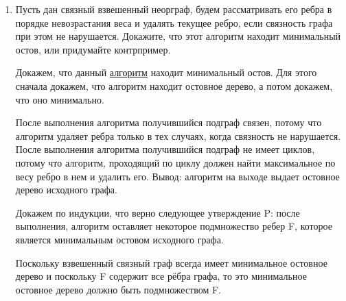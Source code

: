 \begin{enumerate}
  \item
    Пусть дан связный взвешенный неорграф, будем рассматривать его ребра в порядке невозрастания веса и
    удалять текущее ребро, если связность графа при этом не нарушается. Докажите, что этот алгоритм
    находит минимальный остов, или придумайте контрпример.

    \begin{solution}
      Докажем, что данный \href{https://ru.wikipedia.org/wiki/%D0%90%D0%BB%D0%B3%D0%BE%D1%80%D0%B8%D1%82%D0%BC_%D0%BE%D0%B1%D1%80%D0%B0%D1%82%D0%BD%D0%BE%D0%B3%D0%BE_%D1%83%D0%B4%D0%B0%D0%BB%D0%B5%D0%BD%D0%B8%D1%8F}{алгоритм} находит минимальный остов. Для этого сначала докажем, что алгоритм находит остовное дерево, а потом докажем, что оно минимально.

      После выполнения алгоритма получившийся подграф связен, потому что алгоритм удаляет ребра только в тех случаях, когда связность не нарушается. После выполнения алгоритма получившийся подграф не имеет циклов, потому что алгоритм, проходящий по циклу должен найти максимальное по весу ребро в нем и удалить его. Вывод: алгоритм на выходе выдает остовное дерево исходного графа.

      Докажем по индукции, что верно следующее утверждение P: после выполнения, алгоритм оставляет некоторое подмножество ребер F, которое является минимальным остовом исходного графа.
      
      Поскольку взвешенный связный граф всегда имеет минимальное остовное дерево и поскольку F содержит все рёбра графа, то это минимальное остовное дерево должно быть подмножеством F.
      

\end{solution}
\end{enumerate}
